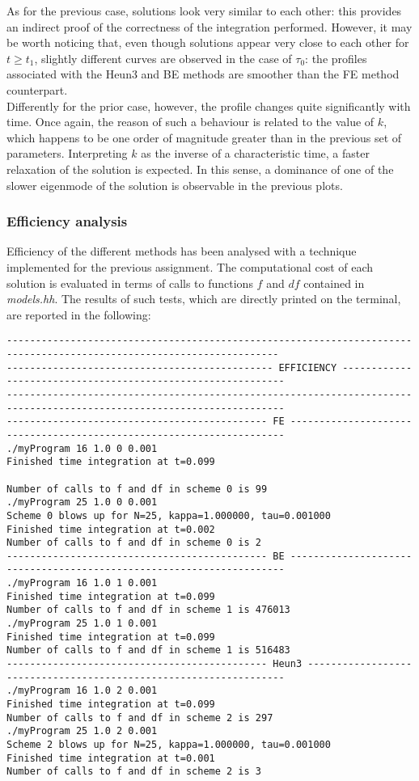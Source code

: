 \documentclass[11pt]{article}
\theoremstyle{theorem}
\theoremstyle{definition}
\begin{document}
As for the previous case, solutions look very similar to each other: this provides an indirect proof of the correctness of the integration performed. However, it may be worth noticing that, even though solutions appear very close to each other for $t\ge t_1$, slightly different curves are observed in the case of $\tau_0$: the profiles associated with the Heun3 and BE methods are smoother than the FE method counterpart.\\
Differently for the prior case, however, the profile changes quite significantly with time. Once again, the reason of such a behaviour is related to the value of $k$, which happens to be one order of magnitude greater than in the previous set of parameters. Interpreting $k$ as the inverse of a characteristic time, a faster relaxation of the solution is expected. In this sense, a dominance of one of the slower eigenmode of the solution is observable in the previous plots.\\ 



\subsubsection{Efficiency analysis}
\label{subsubsec:efficiency}
Efficiency of the different methods has been analysed with a technique implemented for the previous assignment. The computational cost of each solution is evaluated in terms of calls to functions $f$ and $df$ contained in \emph{models.hh}. The results of such tests, which are directly printed on the terminal, are reported in the following:


\begin{lstlisting}
---------------------------------------------------------------------------------------------------------------------
---------------------------------------------- EFFICIENCY ------------------------------------------------------------
----------------------------------------------------------------------------------------------------------------------
--------------------------------------------- FE ---------------------------------------------------------------------
./myProgram 16 1.0 0 0.001
Finished time integration at t=0.099

Number of calls to f and df in scheme 0 is 99
./myProgram 25 1.0 0 0.001
Scheme 0 blows up for N=25, kappa=1.000000, tau=0.001000
Finished time integration at t=0.002
Number of calls to f and df in scheme 0 is 2
--------------------------------------------- BE ---------------------------------------------------------------------
./myProgram 16 1.0 1 0.001
Finished time integration at t=0.099
Number of calls to f and df in scheme 1 is 476013
./myProgram 25 1.0 1 0.001
Finished time integration at t=0.099
Number of calls to f and df in scheme 1 is 516483
--------------------------------------------- Heun3 ------------------------------------------------------------------
./myProgram 16 1.0 2 0.001
Finished time integration at t=0.099
Number of calls to f and df in scheme 2 is 297
./myProgram 25 1.0 2 0.001
Scheme 2 blows up for N=25, kappa=1.000000, tau=0.001000
Finished time integration at t=0.001
Number of calls to f and df in scheme 2 is 3
\end{lstlisting}
\end{document}
